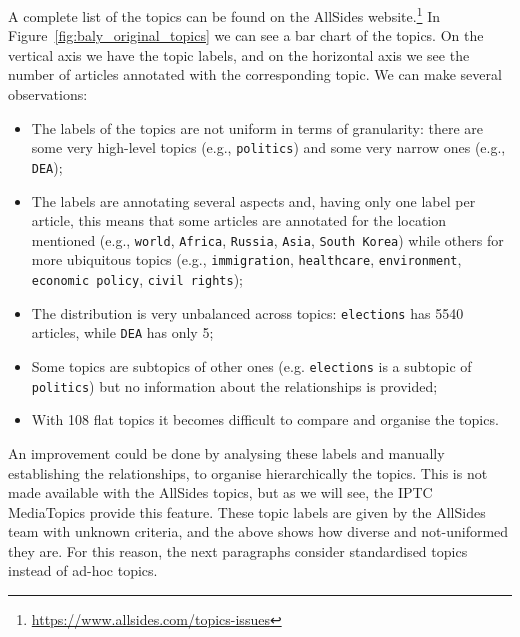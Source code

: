 A complete list of the topics can be found on the AllSides website.\footnote{\url{https://www.allsides.com/topics-issues}}
In Figure~\ref{fig:baly_original_topics}
we can see a bar chart of the topics.
On the vertical axis we have the topic labels, and on the horizontal axis we see the number of articles annotated with the corresponding topic.
We can make several observations:

\begin{itemize}
    \item The labels of the topics are not uniform in terms of granularity: there are some very high-level topics (e.g., \texttt{politics}) and some very narrow ones (e.g., \texttt{DEA});
    \item The labels are annotating several aspects and, having only one label per article, this means that some articles are annotated for the location mentioned (e.g., \texttt{world}, \texttt{Africa}, \texttt{Russia}, \texttt{Asia}, \texttt{South Korea}) while others for more ubiquitous topics (e.g., \texttt{immigration}, \texttt{healthcare}, \texttt{environment}, \texttt{economic policy}, \texttt{civil rights}); %
    \item The distribution is very unbalanced across topics: \texttt{elections} has 5540 articles, while \texttt{DEA} has only 5;
    \item Some topics are subtopics of other ones (e.g. \texttt{elections} is a subtopic of \texttt{politics}) but no information about the relationships is provided;
    \item With 108 flat topics it becomes difficult to compare and organise the topics.
\end{itemize}

An improvement could be done by analysing these labels and manually establishing the relationships, to organise hierarchically the topics.
This is not made available with the AllSides topics, but as we will see, the IPTC MediaTopics provide this feature. 
%
%
%
These topic labels are given by the AllSides team with unknown criteria, and the above shows how diverse and not-uniformed they are.
For this reason, the next paragraphs consider standardised topics instead of ad-hoc topics.


